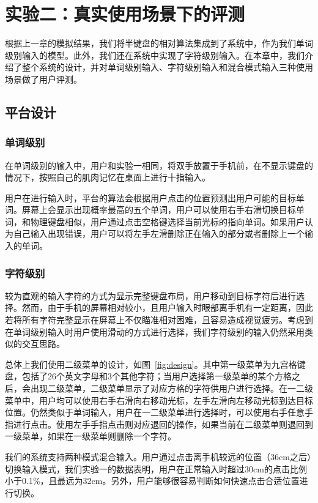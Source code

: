 \chapter{实验二：真实使用场景下的评测} %
\label{cha:evaluation}
根据上一章的模拟结果，我们将半键盘的相对算法集成到了系统中，作为我们单词级别输入的模型。此外，我们还在系统中实现了字符级别输入。在本章中，我们介绍了整个系统的设计，并对单词级别输入、字符级别输入和混合模式输入三种使用场景做了用户评测。

\section{平台设计}
\subsection{单词级别}
在单词级别的输入中，用户和实验一相同，将双手放置于手机前，在不显示键盘的情况下，按照自己的肌肉记忆在桌面上进行十指输入。

用户在进行输入时，平台的算法会根据用户点击的位置预测出用户可能的目标单词。屏幕上会显示出现概率最高的五个单词，用户可以使用右手右滑切换目标单词，和物理键盘相似，用户通过点击空格键选择当前光标的指向单词。如果用户认为自己输入出现错误，用户可以将左手左滑删除正在输入的部分或者删除上一个输入的单词。

\subsection{字符级别}
较为直观的输入字符的方式为显示完整键盘布局，用户移动到目标字符后进行选择。然而，由于手机的屏幕相对较小，且用户输入时眼部离手机有一定距离，因此若将所有字符完整显示在屏幕上不仅瞄准相对困难，且容易造成视觉疲劳。考虑到在单词级别输入时用户使用滑动的方式进行选择，我们字符级别的输入仍然采用类似的交互思路。

总体上我们使用二级菜单的设计，如图~\ref{fig:design}。其中第一级菜单为九宫格键盘，包括了26个英文字母和3个其他字符；当用户选择第一级菜单的某个方格之后，会出现二级菜单，二级菜单显示了对应方格的字符供用户进行选择。在一二级菜单中，用户均可以使用右手右滑向右移动光标，左手左滑向左移动光标到达目标位置。仍然类似于单词输入，用户在一二级菜单进行选择时，可以使用右手任意手指进行点击。使用左手手指点击则对应退回的操作，如果当前在二级菜单则退回到一级菜单，如果在一级菜单则删除一个字符。

我们的系统支持两种模式混合输入。用户通过点击离手机较远的位置（36cm之后）切换输入模式，我们实验一的数据表明，用户在正常输入时超过30cm的点击比例小于0.1\%，且最远为32cm。另外，用户能够很容易判断如何快速点击合适位置进行切换。

